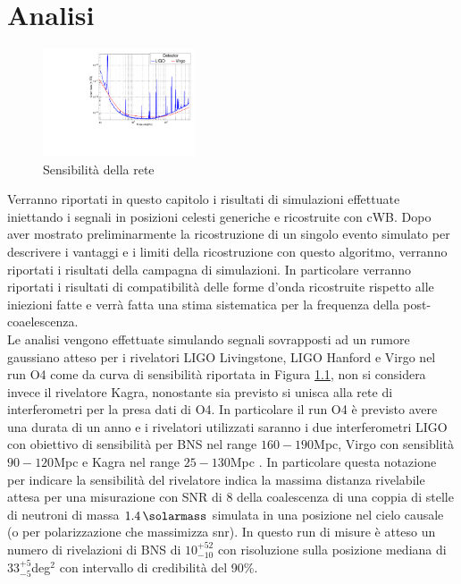\chapter{Analisi}
\label{chapter:analisi}
\begin{figure}
	\vspace{-10pt}
	\begin{center}
		\includegraphics[width=0.4\textwidth]{figures/Capitolo_3/report/pds.pdf}
	\end{center}
	\vspace{-5pt}
	\caption{Sensibilità della rete}
	\label{fig:sensitivity_O4}
	\vspace{-10pt}
\end{figure}
Verranno riportati in questo capitolo i risultati di simulazioni effettuate iniettando i segnali in posizioni celesti generiche e ricostruite con cWB. Dopo aver mostrato preliminarmente la ricostruzione di un singolo evento simulato per descrivere i vantaggi e i limiti della ricostruzione con questo algoritmo, verranno riportati i risultati della campagna di simulazioni. In particolare verranno riportati i risultati di compatibilità delle forme d'onda ricostruite rispetto alle iniezioni fatte e verrà fatta una stima sistematica per la frequenza della post-coaelescenza.\\
Le analisi vengono effettuate simulando segnali sovrapposti ad un rumore gaussiano atteso per i rivelatori LIGO Livingstone, LIGO Hanford e Virgo nel run O4 come da curva di sensibilità riportata in Figura \ref{fig:sensitivity_O4}, non si considera invece il rivelatore Kagra, nonostante sia previsto si unisca alla rete di interferometri per la presa dati di O4. In particolare il run O4 è previsto avere una durata di un anno e i rivelatori utilizzati saranno i due interferometri LIGO con obiettivo di sensibilità per BNS nel range $160-190$Mpc, Virgo con sensiblità $90-120$Mpc e Kagra nel range $25-130$Mpc \cite{Abbott_2020a}. In particolare questa notazione per indicare la sensibilità del rivelatore indica la massima distanza rivelabile attesa per una misurazione con SNR di 8 della coalescenza di una coppia di stelle di neutroni di massa $\SI{1.4}{\solarmass}$ simulata in una posizione nel cielo causale (o per polarizzazione che massimizza snr). In questo run di misure è atteso un numero di rivelazioni di BNS di $10^{+52}_{-10}$ con risoluzione sulla posizione mediana di $33_{-5}^{+5}$deg$^2$ con intervallo di credibilità del 90\%.\\
